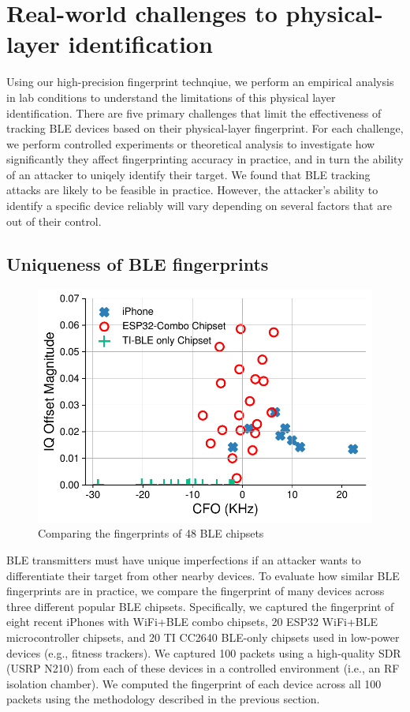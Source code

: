 \section{Real-world challenges to physical-layer identification}
\label{sec:results2}
Using our high-precision fingerprint technqiue, we perform an empirical analysis in lab conditions to understand the limitations of this physical layer identification.
%
There are five primary challenges that limit the effectiveness of tracking
BLE devices based on their physical-layer fingerprint. 
%
For each challenge, we
perform controlled experiments or theoretical analysis to investigate how significantly they affect
fingerprinting accuracy in practice, and in turn the ability of an attacker to uniqely identify their target. 
%
We found that BLE tracking attacks are
likely to be feasible in practice. 
%
However, the attacker's ability to identify a
specific device reliably will vary depending on several factors that are out of
their control.

\subsection{Uniqueness of BLE fingerprints} %
\label{sec:similarity}

\begin{figure}
    \centering
    \captionsetup{justification=centering}
    \includegraphics[width = 0.6\linewidth]{bletracking/plots/cfoiq_iphone_esp_ti2.pdf} 
    \caption{Comparing the fingerprints of 48 BLE chipsets}
\label{fig:cfoiq}
\end{figure}

BLE transmitters must have unique imperfections if an attacker wants to
differentiate their target from other nearby devices.  To evaluate how
similar BLE fingerprints are in practice, we compare the fingerprint of  many
devices across three different popular BLE chipsets. Specifically, we
captured the fingerprint of eight recent iPhones with WiFi+BLE combo
chipsets, 20 ESP32 WiFi+BLE microcontroller chipsets, and 20 TI CC2640
BLE-only chipsets used in low-power devices (e.g., fitness trackers).  We
captured 100 packets using a high-quality SDR (USRP N210) from each of these
devices in a controlled environment (i.e., an RF isolation chamber). We
computed the fingerprint of each device across all 100 packets using the methodology described in
the previous section.

